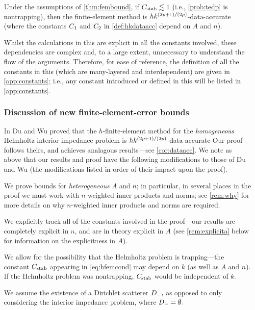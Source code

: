 \label{cor:dataacc}
Under the assumptions of \cref{thm:fembound}, if $C_{\mathrm{stab}} \lesssim 1$ (i.e., \cref{prob:tedp} is nontrapping), then the finite-element method is $hk^{(2p+1)/(2p)}$-data-accurate (where the constants $C_{1}$ and $C_{2}$ in \cref{def:hkdataacc} depend on $A$ and $n$).
\eco

Whilst the calculations in this  are explicit in all the constants involved, these dependencies are complex and, to a large extent, unnecessary to understand the flow of the arguments. Therefore, for ease of reference, the definition of all the constants in this  (which are many-layered and interdependent) are given in \cref{app:constants}; i.e., any constant introduced or defined in this  will be listed in \cref{app:constants}.



\subsubsection{Discussion of new finite-element-error bounds}

In \cite{DuWu:15} Du and Wu proved that the $h$-finite-element method for the \emph{homogeneous} Helmholtz interior impedance problem is $hk^{(2p+1)/(2p)}$-data-accurate  Our proof follows theirs, and achieves analagous results---see \cref{cor:dataacc}. We note as above that our results and proof have the following modifications to those of Du and Wu (the modifications listed in order of their impact upon the proof).
\ben
\item We prove bounds for \emph{heterogeneous} $A$ and $n$; in particular, in several places in the proof we must work with $n$-weighted inner products and norms; see \cref{rem:why} for more details on why $n$-weighted inner products and norms are required.
\item We explicitly track all of the constants involved in the proof---our results are completely explicit in $n$, and are in theory explicit in $A$ (see \cref{rem:explicita} below for information on the explicitness in $A$).
\item We allow for the possibility that the Helmholtz problem is trapping---the constant $C_{\mathrm{stab}}$ appearing in \cref{eq:hfemcond} may depend on $k$ (as well as $A$ and $n$). If the Helmholtz problem was nontrapping, $C_{\mathrm{stab}}$ would be independent of $k$.
  \item We assume the existence of a Dirichlet scatterer $D_{-},$ as opposed to only considering the interior impedance problem, where $D_{-}=\emptyset.$
\een
\ere

